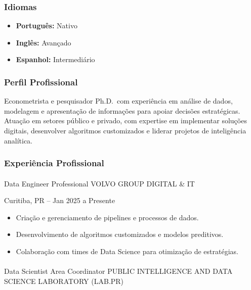 \documentclass[
  letterpaper,
  DIV=11,
  numbers=noendperiod]{scrartcl}
\makeatletter
\let\oldparagraph\paragraph
\renewcommand{\paragraph}{
    \@ifstar
      \xxxParagraphStar
      \xxxParagraphNoStar
  }
\newcommand{\xxxParagraphStar}[1]{\oldparagraph*{#1}\mbox{}}
\newcommand{\xxxParagraphNoStar}[1]{\oldparagraph{#1}\mbox{}}
\providecommand{\tightlist}{%
  \setlength{\itemsep}{0pt}\setlength{\parskip}{0pt}}\usepackage{longtable,booktabs,array}
\makeatother
\begin{document}
\subsubsection{Idiomas}\label{idiomas}

\begin{itemize}
\item
  \textbf{Português:} Nativo
\item
  \textbf{Inglês:} Avançado
\item
  \textbf{Espanhol:} Intermediário
\end{itemize}

\subsubsection{Perfil Profissional}\label{perfil-profissional}

Econometrista e pesquisador Ph.D.~com experiência em análise de dados,
modelagem e apresentação de informações para apoiar decisões
estratégicas. Atuação em setores público e privado, com expertise em
implementar soluções digitais, desenvolver algoritmos customizados e
liderar projetos de inteligência analítica.

\subsubsection{Experiência
Profissional}\label{experiuxeancia-profissional}

\paragraph{Data Engineer Professional \textbar{} VOLVO GROUP DIGITAL \&
IT}\label{data-engineer-professional-volvo-group-digital-it}

{Curitiba, PR -- Jan 2025 a Presente}

\begin{itemize}
\tightlist
\item
  Criação e gerenciamento de pipelines e processos de dados.
\item
  Desenvolvimento de algoritmos customizados e modelos preditivos.
\item
  Colaboração com times de Data Science para otimização de estratégias.
\end{itemize}

\paragraph{Data Scientist Area Coordinator \textbar{} PUBLIC
INTELLIGENCE AND DATA SCIENCE LABORATORY
(LAB.PR)}\label{data-scientist-area-coordinator-public-intelligence-and-data-science-laboratory-lab.pr}
\end{document}
